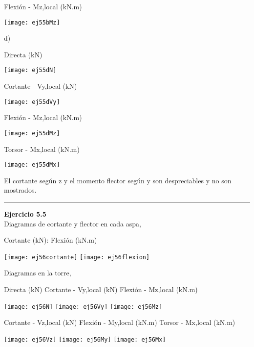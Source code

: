 Flexión - Mz,local (kN.m)

	\begin{center}
	\texttt{[image: ej55bMz]}
\end{center}

d)

Directa (kN)

	\begin{center}
	\texttt{[image: ej55dN]}
\end{center}


Cortante - Vy,local (kN)

\begin{center}
	\texttt{[image: ej55dVy]}
\end{center}

Flexión - Mz,local (kN.m)

\begin{center}
	\texttt{[image: ej55dMz]}
\end{center}


Torsor - Mx,local (kN.m)


\begin{center}
	\texttt{[image: ej55dMx]}
\end{center}

El cortante según z y el momento flector según y son despreciables y no son mostrados. 

\hrule
\vspace{5mm}
\textbf{Ejercicio 5.5}\\

Diagramas de cortante y flector en cada aspa,

Cortante (kN):  \qquad 
Flexión (kN.m)

\texttt{[image: ej56cortante]}
\texttt{[image: ej56flexion]}


Diagramas en la torre,

\noindent
Directa (kN)
\quad
Cortante - Vy,local (kN)
\quad
Flexión - Mz,local (kN.m)

\texttt{[image: ej56N]}
\texttt{[image: ej56Vy]}
\texttt{[image: ej56Mz]}


\noindent
Cortante - Vz,local (kN)
\quad
Flexión - My,local (kN.m)
\quad
Torsor - Mx,local (kN.m)

\texttt{[image: ej56Vz]}
\texttt{[image: ej56My]}
\texttt{[image: ej56Mx]}











